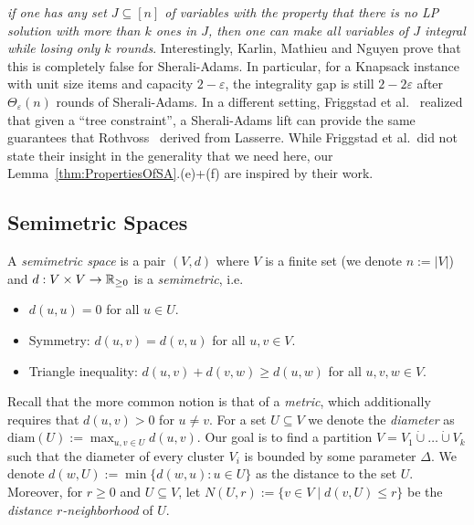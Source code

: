   \emph{if one has any set $J \subseteq [n]$ of variables with the property that
there is no LP solution with more than $k$ ones in $J$, then one can make all variables of $J$ integral while losing only $k$ rounds}.
Interestingly, Karlin, Mathieu and Nguyen prove that this is completely false for Sherali-Adams. 
In particular, for a Knapsack instance with unit size items and capacity $2-\varepsilon$, 
the integrality gap is still $2-2\varepsilon$ after $\Theta_{\varepsilon}(n)$ rounds of Sherali-Adams.
In a different setting, Friggstad et al.~\cite{LP-for-DST-FriggstadKKLST-IPCO14}
realized that given a ``tree constraint'', a Sherali-Adams lift can provide
the same guarantees that Rothvoss~\cite{DirectedSteinerTreeAndLasserre-RothvossArxiv2011} derived from Lasserre. 
While Friggstad et al.~did not state their insight in the generality that we need here, our Lemma~\ref{thm:PropertiesOfSA}.(e)+(f) are inspired by their work.


\subsection{Semimetric Spaces}
\label{sec:semimetric spaces}

A \emph{semimetric space} is a pair $(V,d)$ where $V$ is a finite set (we denote $n := |V|$)
and $d : V \times V \to \mathbb{R}_{\geq 0}$ is a \emph{semimetric}, i.e.
\begin{itemize}
\item $d(u,u) = 0$ for all $u \in U$.
\item Symmetry: $d(u,v) = d(v,u)$ for all $u,v \in V$.
\item Triangle inequality: $d(u,v) + d(v,w) \geq d(u,w)$ for all $u,v,w \in V$. 
\end{itemize}
Recall that the more common notion is that of a \emph{metric}, which additionally requires
that $d(u,v) > 0$ for $u \neq v$.
For a set $U \subseteq V$ we denote the \emph{diameter} as $\textrm{diam}(U) := \max_{u,v \in U} d(u,v)$. 
Our goal is to find a partition $V = V_1 \dot{\cup} \ldots \dot{\cup} V_k$ such that the diameter
of every cluster $V_i$ is bounded by some parameter $\Delta$.
We denote $d(w,U) := \min\{ d(w,u) : u \in U\}$ as the distance to the set $U$.
Moreover, for $r \geq 0$ and $U \subseteq V$, let $N(U,r) := \{ v \in V \mid d(v,U) \leq r\}$ 
be the \emph{distance $r$-neighborhood} of $U$.

